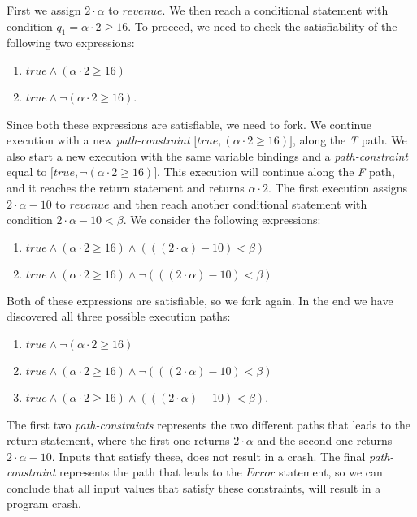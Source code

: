 		First we assign $2\cdot \alpha$ to $revenue$. We then reach a conditional statement with condition $q_1 = \alpha \cdot 2 \geq 16$. To proceed, we need to check the satisfiability of the following two expressions:
		\begin{enumerate}
			\item $true \land (\alpha \cdot 2 \geq 16)$
			\item $true \land \neg (\alpha \cdot 2 \geq 16)$.
		\end{enumerate}
		Since both these expressions are satisfiable, we need to fork. We continue execution with a new  \emph{path-constraint} $\lbrack true, (\alpha \cdot 2 \geq 16) \rbrack$, along the \emph{T} path. We also start a new execution with the same variable bindings and a \emph{path-constraint} equal to $\lbrack true, \neg (\alpha \cdot 2 \geq 16) \rbrack$. This execution will continue along the \emph{F} path, and it reaches the return statement and returns $\alpha \cdot 2$.
		The first execution assigns $2\cdot \alpha - 10$ to $revenue$ and then reach another conditional statement with condition $2\cdot \alpha - 10 < \beta$. We consider the following expressions:
		\begin{enumerate}
			\item $true \land (\alpha \cdot 2 \geq 16) \land (((2\cdot \alpha) - 10) < \beta)$
			\item $true \land (\alpha \cdot 2 \geq 16) \land \neg (((2\cdot \alpha) - 10) < \beta)$
		\end{enumerate}
		Both of these expressions are satisfiable, so we fork again. In the end we have discovered all three possible execution paths:
		\begin{enumerate}
			\item $true \land \neg (\alpha \cdot 2 \geq 16)$
			\item $true \land (\alpha \cdot 2 \geq 16) \land \neg (((2\cdot \alpha) - 10) < \beta)$
			\item $true \land (\alpha \cdot 2 \geq 16) \land (((2\cdot \alpha) - 10) < \beta)$.
		\end{enumerate}
		
		The first two \emph{path-constraints} represents the two different paths that leads to the return statement, where the first one returns $2\cdot \alpha$ and the second one returns $2\cdot \alpha - 10$. Inputs that satisfy these, does not result in a crash.
		The final \emph{path-constraint} represents the path that leads to the $Error$ statement, so we can conclude that all input values that satisfy these constraints, will result in a program crash.
	
